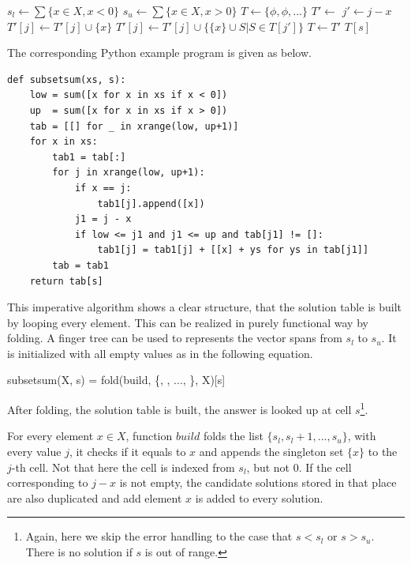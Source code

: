 \documentclass[UTF8]{article}
\begin{document}
\begin{algorithmic}[1]
  \State $s_l \gets \sum \{x \in X, x < 0\}$
  \State $s_u \gets \sum \{x \in X, x > 0\}$
  \State $T \gets \{\phi, \phi, ...\}$ 
    \State $T' \gets$ 
      \State $j' \gets j - x$
        \State $T'[j] \gets T'[j] \cup \{x\}$
      \EndIf
        \State $T'[j] \gets T'[j] \cup \{\{x\} \cup S | S \in T[j']\}$
      \EndIf
    \EndFor
    \State $T \gets T'$
  \EndFor
  \State \Return $T[s]$
\EndFunction
\end{algorithmic}

The corresponding Python example program is given as below.

\lstset{language=Python}
\begin{lstlisting}
def subsetsum(xs, s):
    low = sum([x for x in xs if x < 0])
    up  = sum([x for x in xs if x > 0])
    tab = [[] for _ in xrange(low, up+1)]
    for x in xs:
        tab1 = tab[:]
        for j in xrange(low, up+1):
            if x == j:
                tab1[j].append([x])
            j1 = j - x
            if low <= j1 and j1 <= up and tab[j1] != []:
                tab1[j] = tab1[j] + [[x] + ys for ys in tab[j1]]
        tab = tab1
    return tab[s]
\end{lstlisting}

This imperative algorithm shows a clear structure, that the solution table is
built by looping every element. This can be realized in purely functional
way by folding. A finger tree can be used to represents the vector spans
from $s_l$ to $s_u$. It is initialized with all empty values as in the following
equation.

\be
subsetsum(X, s) = fold(build, \{\phi, \phi, ..., \}, X)[s]
\ee

After folding, the solution table is built, the answer is looked up at
cell $s$\footnote{Again, here we skip the error handling to the case that
$s < s_l$ or $s > s_u$. There is no solution if $s$ is out of range.}.

For every element $x \in X$,
function $build$ folds the list $\{s_l, s_l + 1, ..., s_u\}$, with every
value $j$, it checks if it equals to $x$ and appends the singleton set $\{x\}$
to the $j$-th cell. Not that here the cell is indexed from
$s_l$, but not 0. If the cell corresponding to $j - x$ is not empty,
the candidate solutions stored in that place are also duplicated and
add element $x$ is added to every solution.
\end{document}
